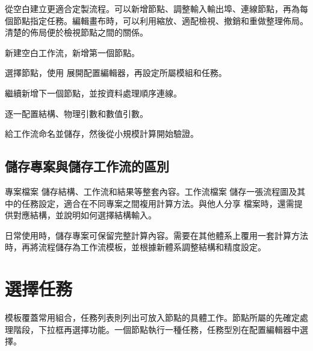 從空白建立更適合定製流程。可以新增節點、調整輸入輸出埠、連線節點，再為每個節點指定任務。編輯畫布時，可以利用縮放、適配檢視、撤銷和重做整理佈局。清楚的佈局便於檢視節點之間的關係。

\begin{steps}
\item 新建空白工作流，新增第一個節點。
\item 選擇節點，使用  展開配置編輯器，再設定所屬模組和任務。
\item 繼續新增下一個節點，並按資料處理順序連線。
\item 逐一配置結構、物理引數和數值引數。
\item 給工作流命名並儲存，然後從小規模計算開始驗證。
\end{steps}

\subsection{儲存專案與儲存工作流的區別}

專案檔案  儲存結構、工作流和結果等整套內容。工作流檔案  儲存一張流程圖及其中的任務設定，適合在不同專案之間複用計算方法。與他人分享  檔案時，還需提供對應結構，並說明如何選擇結構輸入。

日常使用時，儲存專案可保留完整計算內容。需要在其他體系上覆用一套計算方法時，再將流程儲存為工作流模板，並根據新體系調整結構和精度設定。


\section{選擇任務}\label{sec:task-catalog}

模板覆蓋常用組合，任務列表則列出可放入節點的具體工作。節點所屬的先確定處理階段，下拉框再選擇功能。一個節點執行一種任務，任務型別在配置編輯器中選擇。

